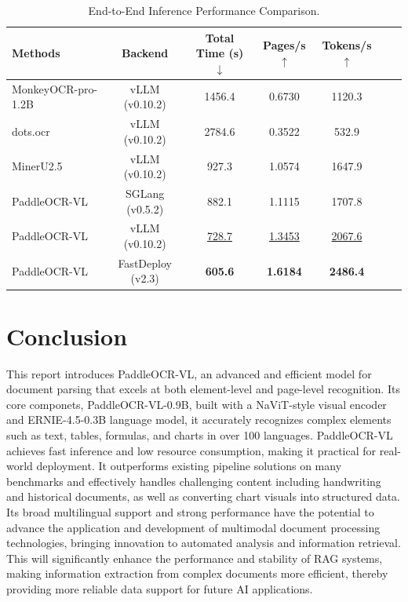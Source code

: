 \documentclass[11pt, a4paper,logo,  copyright, nonumbering]{paddleocr}
\begin{document}
\begin{table}[H]
  \centering
  \fontsize{7}{7}\selectfont
  \renewcommand{\arraystretch}{1.2}
  \begin{tabular}{l|cccccc}
    \toprule
    \textbf{Methods} & \textbf{Backend} & \textbf{Total Time (s)$\downarrow$} & \textbf{Pages/s$\uparrow$} & \textbf{Tokens/s$\uparrow$} 
    \\
    \midrule
    MonkeyOCR-pro-1.2B~\cite{li2025monkeyocr}& vLLM (v0.10.2) & 1456.4 & 0.6730 & 1120.3 & 
    \\
    dots.ocr~\cite{dotsocr} & vLLM (v0.10.2)& 2784.6 & 0.3522 & 532.9 & 
    \\
    MinerU2.5~\cite{niu2025mineru2} & vLLM (v0.10.2)& 927.3 & 1.0574 & 1647.9 & 
    \\
    PaddleOCR-VL& SGLang (v0.5.2)& 882.1 & 1.1115 & 1707.8 & 
    \\
    PaddleOCR-VL& vLLM (v0.10.2) & \cellcolor{cyan!15}\underline{728.7} & \cellcolor{cyan!15}\underline{1.3453} & \cellcolor{cyan!15}\underline{2067.6} & 
    \\
    PaddleOCR-VL & FastDeploy (v2.3) & \cellcolor{red!15}\textbf{605.6} & \cellcolor{red!15}\textbf{1.6184} & \cellcolor{red!15}\textbf{2486.4} & 
    \\
    \bottomrule
  \end{tabular}
  \caption{
    End-to-End Inference Performance Comparison. 
  }
  \label{tab:inference_performance}
\end{table}


\section{Conclusion}

This report introduces PaddleOCR-VL, an advanced and efficient model for document parsing that excels at both element-level and page-level recognition. Its core componets, PaddleOCR-VL-0.9B, built with a NaViT-style visual encoder and ERNIE-4.5-0.3B language model, it accurately recognizes complex elements such as text, tables, formulas, and charts in over 100 languages. PaddleOCR-VL achieves fast inference and low resource consumption, making it practical for real-world deployment. It outperforms existing pipeline solutions on many benchmarks and effectively handles challenging content including handwriting and historical documents, as well as converting chart visuals into structured data. Its broad multilingual support and strong performance have the potential to advance the application and development of multimodal document processing technologies, bringing innovation to automated analysis and information retrieval. This will significantly enhance the performance and stability of RAG systems, making information extraction from complex documents more efficient, thereby providing more reliable data support for future AI applications.
% 

\end{document}
